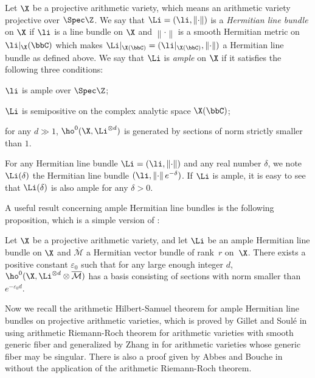 \begin{defi}
Let $\X$ be a projective arithmetic variety, which means an arithmetic variety projective over $\Spec \Z$. We say that $\Li=(\li, \left\lVert\cdot\right\rVert)$ is a \emph{Hermitian line bundle} on $\X$ if $\li$ is a line bundle on $\X$ and $\left\lVert\cdot\right\rVert$ is a smooth Hermitian metric on $\li|_\X(\bbC)$ which makes $\Li|_{\X(\bbC)}=(\li|_{\X(\bbC)}, \left\lVert\cdot\right\rVert)$ a Hermitian line bundle as defined above. We say that $\Li$ is \emph{ample} on $\X$ if it satisfies the following three conditions:
\begin{enumeratei}
\item $\li$ is ample over $\Spec \Z$;
\item $\Li$ is semipositive on the complex analytic space $\X(\bbC)$;
\item for any $d\gg 1$, $\ho^0(\X,\Li^{\otimes d})$ is generated by sections of norm strictly smaller than $1$.
\end{enumeratei}
\end{defi}

For any Hermitian line bundle $\Li=(\li, \left\lVert\cdot\right\rVert)$ and any real number $\delta$, we note $\Li(\delta)$ the Hermitian line bundle $(\li, \left\lVert\cdot\right\rVert e^{-\delta})$. If $\Li$ is ample, it is easy to see that $\Li(\delta)$ is also ample for any $\delta>0$.

A useful result concerning ample Hermitian line bundles is the following proposition, which is a simple version of \cite[Prop.\,2.4]{Ch17}:
\begin{prop}\label{epsilon}
Let $\X$ be a projective arithmetic variety, and let $\Li$ be an ample Hermitian line bundle on $\X$ and $\overline{\mathcal{M}}$ a Hermitian vector bundle of rank~$r$ on~$\X$. There exists a positive constant $\varepsilon_0$ such that for any large enough integer $d$, \hbox{$\ho^0(\X, \Li^{\otimes d}\otimes \overline{\mathcal{M}})$} has a basis consisting of sections with norm smaller than $e^{-\varepsilon_0 d}$.
\end{prop}
Now we recall the arithmetic Hilbert-Samuel theorem for ample Hermitian line bundles on projective arithmetic varieties, which is proved by Gillet and Soulé in \cite{GS92} using arithmetic Riemann-Roch theorem for arithmetic varieties with smooth generic fiber and generalized by Zhang in \cite{Zh95} for arithmetic varieties whose generic fiber may be singular. There is also a proof given by Abbes and Bouche in \cite{AB95} without the application of the arithmetic Riemann-Roch theorem.

